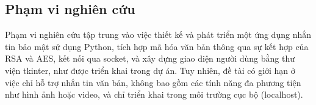 \subsection{ Phạm vi nghiên cứu}
\hspace*{2em} Phạm vi nghiên cứu tập trung vào việc thiết kế và phát triển một ứng dụng nhắn tin bảo mật sử dụng Python, tích hợp mã hóa văn bản thông qua sự kết hợp của RSA và AES, kết nối qua socket, và xây dựng giao diện người dùng bằng thư viện tkinter, như được triển khai trong dự án. Tuy nhiên, đề tài có giới hạn ở việc chỉ hỗ trợ nhắn tin văn bản, không bao gồm các tính năng đa phương tiện như hình ảnh hoặc video, và chỉ triển khai trong môi trường cục bộ (localhost).

